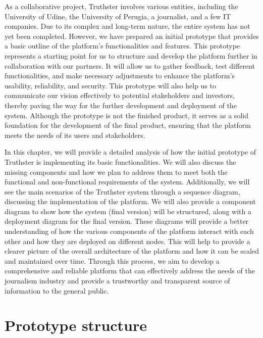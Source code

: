 \documentclass[target=mst,aauheader=]{thud}
\begin{document}
As a collaborative project, Truthster involves various entities, including the University of Udine, the University of Perugia, a journalist, and a few IT companies. Due to its complex and long-term nature, the entire system has not yet been completed. However, we have prepared an initial prototype that provides a basic outline of the platform's functionalities and features. This prototype represents a starting point for us to structure and develop the platform further in collaboration with our partners. It will allow us to gather feedback, test different functionalities, and make necessary adjustments to enhance the platform's usability, reliability, and security. This prototype will also help us to communicate our vision effectively to potential stakeholders and investors, thereby paving the way for the further development and deployment of the system. Although the prototype is not the finished product, it serves as a solid foundation for the development of the final product, ensuring that the platform meets the needs of its users and stakeholders.\par
In this chapter, we will provide a detailed analysis of how the initial prototype of Truthster is implementing its basic functionalities. We will also discuss the missing components and how we plan to address them to meet both the functional and non-functional requirements of the system. Additionally, we will see the main scenarios of the Truthster system through a sequence diagram, discussing the implementation of the platform. We will also provide a component diagram to show how the system (final version) will be structured, along with a deployment diagram for the final version. These diagrams will provide a better understanding of how the various components of the platform interact with each other and how they are deployed on different nodes. This will help to provide a clearer picture of the overall architecture of the platform and how it can be scaled and maintained over time. Through this process, we aim to develop a comprehensive and reliable platform that can effectively address the needs of the journalism industry and provide a trustworthy and transparent source of information to the general public.

\section{Prototype structure}
\end{document}
